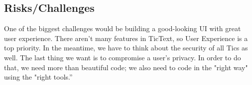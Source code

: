 \subsection{Risks/Challenges}
One of the biggest challenges would be building a good-looking UI with great user experience. There aren't many features in TicText, so User Experience is a top priority. In the meantime, we have to think about the security of all Tics as well. The last thing we want is to compromise a user's privacy. In order to do that, we need more than beautiful code; we also need to code in the "right way" using the "right tools.''